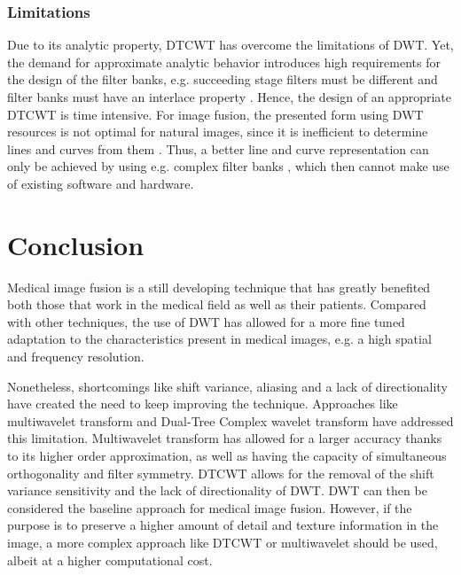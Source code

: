 \documentclass{article}
\begin{document}
\subsubsection{Limitations}
Due to its analytic property, DTCWT has overcome the limitations of DWT. Yet, the demand for approximate analytic behavior introduces high requirements for the design of the filter banks, e.g. succeeding stage filters must be different and filter banks must have an interlace property \cite{IvanW.Selesnick.2005}. Hence, the design of an appropriate DTCWT is time intensive. For image fusion, the presented form using DWT resources is not optimal for natural images, since it is inefficient to determine lines and curves from them \cite{IvanW.Selesnick.2005}. Thus, a better line and curve representation can only be achieved by using e.g. complex filter banks \cite{IvanW.Selesnick.2005}, which then cannot make use of existing software and hardware.  

\section{Conclusion}
\label{sec:print}

Medical image fusion is a still developing technique that has greatly benefited both those that work in the medical field as well as their patients. Compared with other techniques, the use of DWT has allowed for a more fine tuned adaptation to the characteristics present in medical images, e.g. a high spatial and frequency resolution.


Nonetheless, shortcomings like shift variance, aliasing and a lack of directionality have created the need to keep improving the technique. Approaches like multiwavelet transform and Dual-Tree Complex wavelet transform have addressed this limitation. Multiwavelet transform has allowed for a larger accuracy thanks to its higher order approximation, as well as having the capacity of simultaneous orthogonality and filter symmetry. DTCWT allows for the removal of the shift variance sensitivity and the lack of directionality of DWT. 
DWT can then be considered the baseline approach for medical image fusion. However, if the purpose is to preserve a higher amount of detail and texture information in the image, a more complex approach like DTCWT or multiwavelet should be used, albeit at a higher computational cost.
\end{document}
